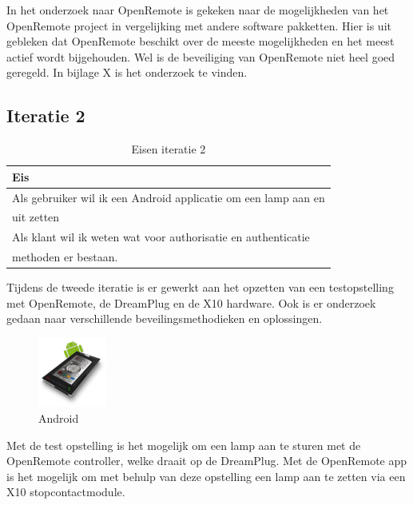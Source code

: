 \documentclass[]{article}
\begin{document}
In het onderzoek naar OpenRemote is gekeken naar de mogelijkheden van het
OpenRemote project in vergelijking met andere software pakketten. Hier is uit
gebleken dat OpenRemote beschikt over de meeste mogelijkheden en het meest
actief wordt bijgehouden. Wel is de beveiliging van OpenRemote niet heel
goed geregeld. In bijlage X is het onderzoek te vinden.

\subsection{Iteratie 2}
\begin{table}[htpb]
  \caption{Eisen iteratie 2}
  \begin{center}
    \begin{tabular}{|| l ||}\hline
        Eis                                                              \\\hline\hline
        Als gebruiker wil ik een Android applicatie om een lamp aan en   \\ 
        uit zetten                                                       \\\hline
        Als klant wil ik weten wat voor authorisatie en authenticatie    \\
        methoden er bestaan.                                             \\\hline
    \end{tabular}
  \end{center}
\end{table}

Tijdens de tweede iteratie is er gewerkt aan het opzetten van een
testopstelling met OpenRemote, de DreamPlug en de X10 hardware. Ook is er
onderzoek gedaan naar verschillende beveilingsmethodieken en oplossingen.

\begin{figure}
  \begin{center}
    \includegraphics[width=0.20\textwidth]{android.pdf}
  \end{center}
  \caption{Android}
\end{figure}

Met de test opstelling is het mogelijk om een lamp
aan te sturen met de OpenRemote controller, welke draait op de
DreamPlug. Met de OpenRemote app is het mogelijk om met behulp van deze
opstelling een lamp aan te zetten via een X10 stopcontactmodule.
\end{document}
